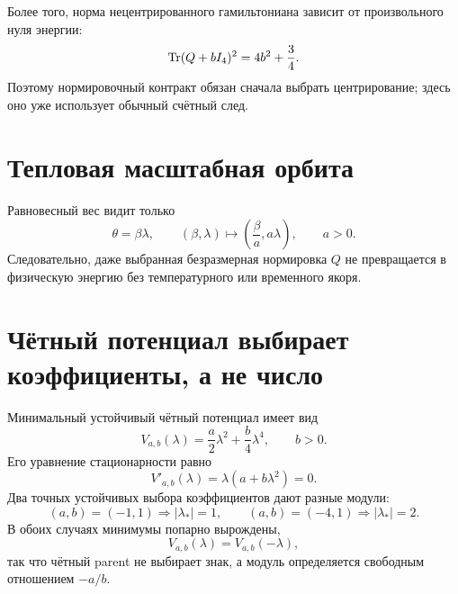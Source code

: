 Более того, норма нецентрированного гамильтониана зависит от произвольного
нуля энергии:
\begin{equation}
 \operatorname{Tr}(Q+bI_4)^2=4b^2+\frac34.
 \label{eq:v8-baryon-c0-central-gap-uncentered-norm-shift-dependence}
\end{equation}
Поэтому нормировочный контракт обязан сначала выбрать центрирование; здесь
оно уже использует обычный счётный след.

\section{Тепловая масштабная орбита}

Равновесный вес видит только
\begin{equation}
 \theta=\beta\lambda,
 \qquad
 (\beta,\lambda)\longmapsto
 \left(\frac\beta a,a\lambda\right),
 \qquad a>0.
 \label{eq:v8-baryon-c0-central-gap-coefficient-thermal-scale-orbit}
\end{equation}
Следовательно, даже выбранная безразмерная нормировка $Q$ не превращается в
физическую энергию без температурного или временного якоря.

\section{Чётный потенциал выбирает коэффициенты, а не число}

Минимальный устойчивый чётный потенциал имеет вид
\begin{equation}
 V_{a,b}(\lambda)=\frac a2\lambda^2+\frac b4\lambda^4,
 \qquad b>0.
 \label{eq:v8-baryon-c0-central-gap-even-quartic-potential}
\end{equation}
Его уравнение стационарности равно
\begin{equation}
 V'_{a,b}(\lambda)=\lambda(a+b\lambda^2)=0.
 \label{eq:v8-baryon-c0-central-gap-even-potential-stationarity}
\end{equation}
Два точных устойчивых выбора коэффициентов дают разные модули:
\begin{equation}
 (a,b)=(-1,1)\Longrightarrow |\lambda_*|=1,
 \qquad
 (a,b)=(-4,1)\Longrightarrow |\lambda_*|=2.
 \label{eq:v8-baryon-c0-central-gap-quartic-magnitude-witnesses}
\end{equation}
В обоих случаях минимумы попарно вырождены,
\begin{equation}
 V_{a,b}(\lambda)=V_{a,b}(-\lambda),
 \label{eq:v8-baryon-c0-central-gap-even-potential-sign-degeneracy}
\end{equation}
так что чётный parent не выбирает знак, а модуль определяется свободным
отношением $-a/b$.

